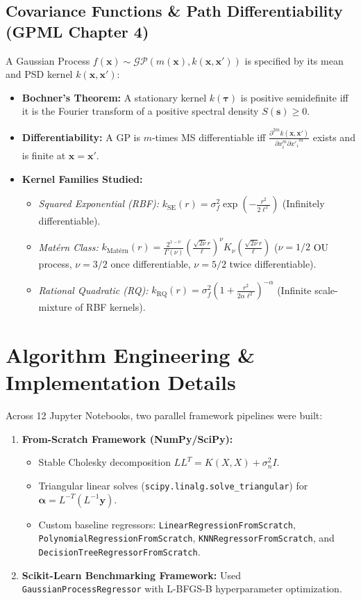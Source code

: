 \documentclass[11pt,a4paper]{article}
\begin{document}
\subsection{Covariance Functions \& Path Differentiability (GPML Chapter 4)}
A Gaussian Process $f(\mathbf{x}) \sim \mathcal{GP}(m(\mathbf{x}), k(\mathbf{x}, \mathbf{x}'))$ is specified by its mean and PSD kernel $k(\mathbf{x}, \mathbf{x}')$:
\begin{itemize}
  \item \textbf{Bochner's Theorem:} A stationary kernel $k(\boldsymbol{\tau})$ is positive semidefinite iff it is the Fourier transform of a positive spectral density $S(\mathbf{s}) \ge 0$.
  \item \textbf{Differentiability:} A GP is $m$-times MS differentiable iff $\frac{\partial^{2m} k(\mathbf{x}, \mathbf{x}')}{\partial x_i^m \partial {x'_i}^m}$ exists and is finite at $\mathbf{x} = \mathbf{x}'$.
  \item \textbf{Kernel Families Studied:}
    \begin{itemize}
      \item \emph{Squared Exponential (RBF):} $k_{\text{SE}}(r) = \sigma_f^2 \exp\left(-\frac{r^2}{2\ell^2}\right)$ (Infinitely differentiable).
      \item \emph{Matérn Class:} $k_{\text{Matérn}}(r) = \frac{2^{1-\nu}}{\Gamma(\nu)}\left(\frac{\sqrt{2\nu}r}{\ell}\right)^\nu K_\nu\left(\frac{\sqrt{2\nu}r}{\ell}\right)$ ($\nu=1/2$ OU process, $\nu=3/2$ once differentiable, $\nu=5/2$ twice differentiable).
      \item \emph{Rational Quadratic (RQ):} $k_{\text{RQ}}(r) = \sigma_f^2 \left(1 + \frac{r^2}{2\alpha \ell^2}\right)^{-\alpha}$ (Infinite scale-mixture of RBF kernels).
    \end{itemize}
\end{itemize}

\section{Algorithm Engineering \& Implementation Details}

Across 12 Jupyter Notebooks, two parallel framework pipelines were built:
\begin{enumerate}
  \item \textbf{From-Scratch Framework (NumPy/SciPy):}
    \begin{itemize}
      \item Stable Cholesky decomposition $L L^T = K(X,X) + \sigma_n^2 I$.
      \item Triangular linear solves (\texttt{scipy.linalg.solve\_triangular}) for $\boldsymbol{\alpha} = L^{-T}(L^{-1}\mathbf{y})$.
      \item Custom baseline regressors: \texttt{LinearRegressionFromScratch}, \texttt{PolynomialRegressionFromScratch}, \texttt{KNNRegressorFromScratch}, and \texttt{DecisionTreeRegressorFromScratch}.
    \end{itemize}
  \item \textbf{Scikit-Learn Benchmarking Framework:} Used \texttt{GaussianProcessRegressor} with L-BFGS-B hyperparameter optimization.
\end{enumerate}
\end{document}
